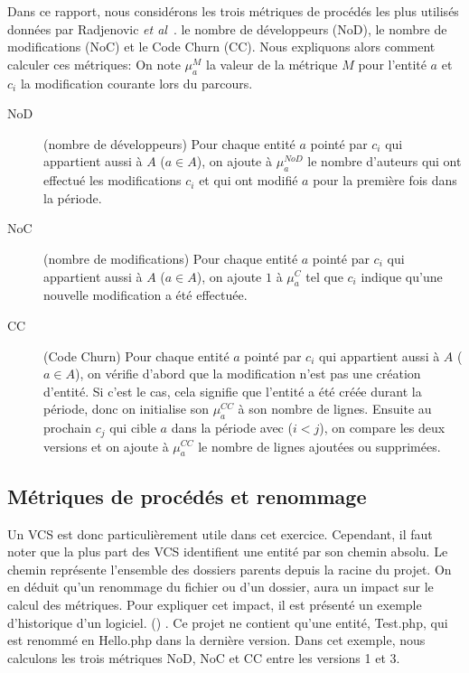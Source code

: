 Dans ce rapport, nous considérons les trois métriques de procédés les plus utilisés données par Radjenovic \emph{et al}~\cite{radjenovic_software_2013}. le nombre de développeurs (NoD), le nombre de modifications (NoC) et le Code Churn (CC). Nous expliquons alors comment calculer ces métriques:
On note $\mu_{a}^{M}$ la valeur de la métrique $M$ pour l'entité $a$ et  $c_i$ la modification courante lors du parcours. 
\begin{description}
	\item[NoD] (nombre de développeurs) Pour chaque entité $a$ pointé par $c_i$ qui appartient aussi à $A$ ($a \in A$), on ajoute à $\mu_{a}^{NoD}$ le nombre d'auteurs qui ont effectué les modifications $c_i$ et qui ont modifié $a$ pour la première fois dans la période.
	\item[NoC] (nombre de modifications) Pour chaque entité $a$ pointé par $c_i$ qui appartient aussi à $A$ ($a \in A$), on ajoute $1$ à $\mu_{a}^{C}$ tel que $c_i$ indique qu'une nouvelle modification a été effectuée.
	\item[CC] (Code Churn) Pour chaque entité $a$ pointé par $c_i$ qui appartient aussi à $A$ ($a \in A$), on vérifie d'abord que la modification n'est pas une création d'entité. Si c'est le cas, cela signifie que l'entité a été créée durant la période, donc on initialise son $\mu_{a}^{CC}$ à son nombre de lignes. Ensuite au prochain $c_j$ qui cible $a$ dans la période avec ($i < j$), on compare les deux versions et on ajoute à $\mu_{a}^{CC}$ le nombre de lignes ajoutées ou supprimées.
\end{description}


\subsection{Métriques de procédés et renommage}

Un VCS est donc particulièrement utile dans cet exercice. Cependant, il faut noter que la plus part des VCS identifient une entité par son chemin absolu. Le chemin représente l'ensemble des dossiers parents depuis la racine du projet. On en déduit qu'un renommage du fichier ou d'un dossier, aura un impact sur le calcul des métriques. Pour expliquer cet impact, il est présenté un exemple d'historique d'un logiciel. () . Ce projet ne contient qu'une entité, Test.php, qui est renommé en Hello.php dans la dernière version. Dans cet exemple, nous calculons les trois métriques NoD, NoC et CC entre les versions 1 et 3.\\


